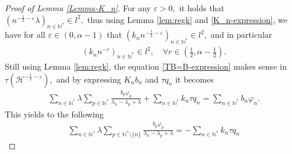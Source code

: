 \documentclass[11pt, dvipsnames]{amsart}
\begin{document}
{\color{black}
\begin{proof}[Proof of Lemma \ref{Lemma-K_n}]
For any $\varepsilon >0,$ it holds that $(n^{-\frac{1}{2}-\varepsilon}\lambda)_{n\in\mathbb{N}^{*}}\in l^2,$ thus using Lemma \ref{lem:regk} and \eqref{K_n-expression}, we have for all $\varepsilon\in (0,\alpha-1)$ that
$(k_n n^{-\frac{1}{2}-\varepsilon})_{n\in \mathbb{N}^*}\in l^2,$ and in particular
\begin{align} 
    (k_n n^{-r})_{n\in \mathbb{N}^*}\in l^2,\quad \forall r\in \left(\frac{1}{2},\alpha-\frac{1}{2}\right).\label{kn-regular0}
\end{align}
Still using Lemma \ref{lem:regk}, the equation \eqref{TB=B-expression} makes sense in $\tau(\mathcal{H}^{-\frac{1}{2}-\varepsilon}),$ and by expressing $K_n b_n$ and $\tau q_n$ it becomes
\begin{align*}
   \sum_{n\in \mathbb{N}^*}\lambda \sum_{p\in \mathbb{N}^*}\frac{b_{p}\varphi_p}{\lambda_n-\lambda_p+\lambda}+ \sum_{n\in \mathbb{N}^*}k_{n}\tau q_{n}= \sum_{n\in \mathbb{N}^*}b_n \varphi_n.
\end{align*}
This yields to the following
\begin{align}
   \sum_{n\in \mathbb{N}^*}\lambda \sum_{p\in \mathbb{N}^*\setminus\{n\}}\frac{b_{p}\varphi_p}{\lambda_n-\lambda_p+\lambda} = -\sum_{n\in \mathbb{N}^*}k_{n}\tau q_{n}\label{sum-regular}
\end{align}


\end{proof}}
\end{document}
